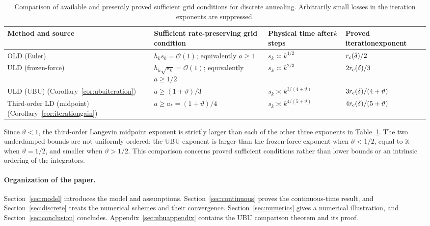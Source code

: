 \documentclass[11pt]{article}
\theoremstyle{definition}
\begin{document}
\begin{table}[ht]
\centering
\small
\renewcommand{\arraystretch}{1.25}
\begin{tabular}{@{}p{}p{}p{}p{}@{}}
\toprule
Method and source & Sufficient rate-preserving grid condition
& Physical time after\newline $k$ steps & Proved iteration\newline exponent \\
\midrule
OLD (Euler)\newline
\cite{TangWuZhou2024}
& $h_ks_k=\mathcal{O}(1)$; equivalently $a\geq1$
& $s_k\asymp k^{1/2}$
& $r_{\rm c}(\delta)/2$ \\
ULD (frozen-force)\newline
\cite[Theorem~2.8]{HeTanWu2024}
& $h_k\sqrt{s_k}=\mathcal{O}(1)$; equivalently $a\geq1/2$
& $s_k\asymp k^{2/3}$
& $2r_{\rm c}(\delta)/3$ \\
ULD (UBU)\newline
(Corollary~\ref{cor:ubuiteration})
& $a\geq(1+\vartheta)/3$
& $s_k\asymp k^{3/(4+\vartheta)}$
& $3r_{\rm c}(\delta)/(4+\vartheta)$ \\
Third-order LD (midpoint)\newline
(Corollary~\ref{cor:iterationgain})
& $a\geq a_*=(1+\vartheta)/4$
& $s_k\asymp k^{4/(5+\vartheta)}$
& $4r_{\rm c}(\delta)/(5+\vartheta)$ \\
\bottomrule
\end{tabular}
\caption{Comparison of available and presently proved sufficient grid conditions
for discrete annealing. Arbitrarily small losses in the
iteration exponents are suppressed.}
\label{tab:introdiscretecomparison}
\end{table}

Since $\vartheta<1$, the third-order Langevin midpoint exponent is strictly larger
than each of the other three exponents in
Table~\ref{tab:introdiscretecomparison}. The two underdamped bounds are not
uniformly ordered: the UBU exponent is larger than the frozen-force exponent
when $\vartheta<1/2$, equal to it when $\vartheta=1/2$, and smaller when
$\vartheta>1/2$. This comparison concerns proved sufficient conditions rather
than lower bounds or an intrinsic ordering of the integrators.

\paragraph{Organization of the paper.}
Section~\ref{sec:model} introduces the model and assumptions.
Section~\ref{sec:continuous} proves the continuous-time result, and
Section~\ref{sec:discrete} treats the numerical schemes and their convergence.
Section~\ref{sec:numerics} gives a numerical illustration, and
Section~\ref{sec:conclusion} concludes. Appendix~\ref{sec:ubuappendix} contains the UBU
comparison theorem and its proof.
\end{document}

